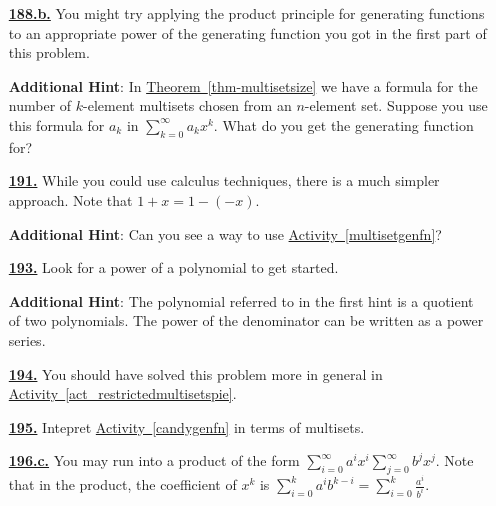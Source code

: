 \documentclass[10pt,]{book}
\theoremstyle{plain}
\theoremstyle{definition}
\theoremstyle{definition}
\theoremstyle{definition}
\numberwithin{equation}{chapter}
\begin{document}
\begin{itemize}[itemsep=1em]
\hypertarget{a-188.b}{}\item[\textbf{\hyperref[task-174]{188.b.}}]
\hypertarget{p-892}{}%
You might try applying the product principle for generating functions to an appropriate power of the generating function you got in the first part of this problem.%

\par\smallskip
\noindent\textbf{Additional Hint}: \hypertarget{p-893}{}%
In \hyperref[thm-multisetsize]{Theorem~\ref{thm-multisetsize}} we have a formula for the number of \(k\)-element multisets chosen from an \(n\)-element set. Suppose you use this formula for \(a_k\) in \(\sum_{k=0}^\infty a_kx^k\). What do you get the generating function for?%

\hypertarget{a-191}{}\item[\textbf{\hyperref[negnchoosek]{191.}}]
\hypertarget{p-901}{}%
While you could use calculus techniques, there is a much simpler approach. Note that \(1 + x = 1 - (-x)\).%

\par\smallskip
\noindent\textbf{Additional Hint}: \hypertarget{p-902}{}%
Can you see a way to use \hyperref[multisetgenfn]{Activity~\ref{multisetgenfn}}?%

\hypertarget{a-193}{}\item[\textbf{\hyperref[candygenfn]{193.}}]
\hypertarget{p-907}{}%
Look for a power of a polynomial to get started.%

\par\smallskip
\noindent\textbf{Additional Hint}: \hypertarget{p-908}{}%
The polynomial referred to in the first hint is a quotient of two polynomials.  The power of the denominator can be written as a power series.%

\hypertarget{a-194}{}\item[\textbf{\hyperref[activity-194]{194.}}]
\hypertarget{p-912}{}%
You should have solved this problem more in general in \hyperref[act_restrictedmultisetspie]{Activity~\ref{act_restrictedmultisetspie}}.%

\hypertarget{a-195}{}\item[\textbf{\hyperref[activity-195]{195.}}]
\hypertarget{p-915}{}%
Intepret \hyperref[candygenfn]{Activity~\ref{candygenfn}} in terms of multisets.%

\hypertarget{a-196.c}{}\item[\textbf{\hyperref[task-177]{196.c.}}]
\hypertarget{p-925}{}%
You may run into a product of the form \(\sum_{i=0}^\infty a^ix^i\sum_{j=0}^\infty b^jx^j\). Note that in the product, the coefficient of \(x^k\) is \(\sum_{i=0}^k a^ib^{k-i} = \sum_{i=0}^k \frac{a^i}{b^i}\).%


\end{itemize}
\end{document}
